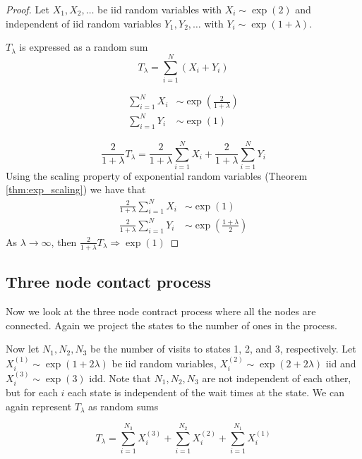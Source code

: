 \documentclass{article}
\theoremstyle{plain}
\theoremstyle{definition}
\theoremstyle{remark}
\begin{document}
\begin{proof}
Let $X_1, X_2, \ldots$ be iid random variables with
$X_i \sim \exp(2)$ and independent of iid random variables $Y_1, Y_2, \ldots$ with  $Y_i \sim \exp(1 + \lambda)$.

$T_\lambda$ is expressed as a random sum
$$
T_\lambda = \sum_{i = 1}^N (X_i + Y_i)
$$

\begin{align*}
    \sum_{i = 1}^N X_i &\sim \exp\left( \frac{2}{1 + \lambda} \right)\\
    \sum_{i = 1}^N Y_i &\sim \exp( 1 )
\end{align*}

$$
    \frac{2}{1 + \lambda} T_\lambda = 
    \frac{2}{1 + \lambda}\sum_{i = 1}^N X_i + \frac{2}{1 + \lambda}\sum_{i = 1}^N Y_i
$$
Using the scaling property of exponential random variables (Theorem \ref{thm:exp_scaling}) we have that
\begin{align*}
    \frac{2}{1 + \lambda}\sum_{i = 1}^N X_i &\sim \exp( 1 )\\
    \frac{2}{1 + \lambda}\sum_{i = 1}^N Y_i &\sim \exp \left( \frac{1 + \lambda}{2} \right)
\end{align*}
As $\lambda \to \infty$, then $\frac{2}{1 + \lambda} T_\lambda \Rightarrow \exp(1)$
\end{proof}


\subsection{Three node contact process}
Now we look at the three node contract process where all the nodes are connected.
Again we project the states to the number of ones in the process.

Now let $N_1, N_2, N_3$ be the number of visits to states 1, 2, and 3, respectively.
Let $X_i^{(1)} \sim \exp(1 + 2\lambda)$ be iid random variables, $X_i^{(2)} \sim \exp(2 + 2\lambda)$ iid and $X_i^{(3)} \sim \exp(3)$ idd.
Note that $N_1, N_2, N_3$ are not independent of each other, but for each $i$ each state is independent of the wait times at the state.
We can again represent $T_\lambda$ as random sums

\begin{equation}
    T_\lambda = \sum_{i = 1}^{N_3} X_i^{(3)} + \sum_{i = 1}^{N_2} X_i^{(2)} + \sum_{i = 1}^{N_1} X_i^{(1)}
\end{equation}
\end{document}
